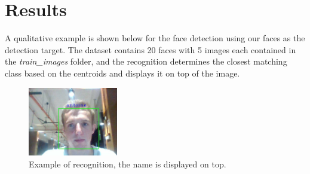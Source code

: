 \documentclass[a4paper]{article}
\begin{document}
\section{Results}

A qualitative example is shown below for the face detection using our faces as the detection target. The dataset contains 20 faces with 5 images each contained in the \textit{train\_images} folder, and the recognition determines the closest matching class based on the centroids and displays it on top of the image. 

\begin{figure}[b]
\centering
\includegraphics[width=0.35\textwidth]{images/detection1.jpg}
\caption{\label{fig:detetion}Example of recognition, the name is displayed on top.}
\end{figure}
\end{document}
